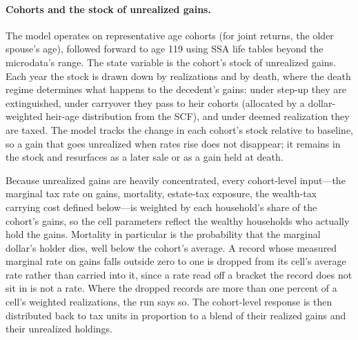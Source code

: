 \documentclass[10pt,twocolumn]{article}
\begin{document}
\paragraph{Cohorts and the stock of unrealized gains.}
The model operates on representative age cohorts (for joint returns, the older
spouse's age), followed forward to age 119 using SSA life tables beyond the
microdata's range. The state variable is the cohort's stock of unrealized
gains. Each year the stock is drawn down by realizations and by death, where
the death regime determines what happens to the decedent's gains: under
step-up they are extinguished, under carryover they pass to heir cohorts
(allocated by a dollar-weighted heir-age distribution from the SCF), and under
deemed realization they are taxed. The model tracks the change in each
cohort's stock relative to baseline, so a gain that goes unrealized when rates
rise does not disappear; it remains in the stock and resurfaces as a later
sale or as a gain held at death.

Because unrealized gains are heavily concentrated, every cohort-level
input---the marginal tax rate on gains, mortality, estate-tax exposure, the
wealth-tax carrying cost defined below---is weighted by each household's share
of the cohort's gains, so the cell parameters reflect the wealthy households
who actually hold the gains. Mortality in particular is the probability that
the marginal dollar's holder dies, well below the cohort's average. A record
whose measured marginal rate on gains falls outside zero to one is dropped
from its cell's average rate rather than carried into it, since a rate read
off a bracket the record does not sit in is not a rate. Where the dropped
records are more than one percent of a cell's weighted realizations, the run
says so. The cohort-level response is then distributed back to tax units in
proportion to a blend of their realized gains and their unrealized holdings.
\end{document}
